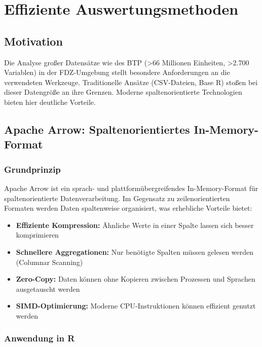 \documentclass[
  ngerman,
  10pt,
  twocolumn]{article}
\providecommand{\tightlist}{%
  \setlength{\itemsep}{0pt}\setlength{\parskip}{0pt}}
\begin{document}
\section{Effiziente Auswertungsmethoden}\label{sec-methoden}

\subsection{Motivation}\label{motivation}

Die Analyse großer Datensätze wie des BTP (\textgreater66 Millionen
Einheiten, \textgreater2.700 Variablen) in der FDZ-Umgebung stellt
besondere Anforderungen an die verwendeten Werkzeuge. Traditionelle
Ansätze (CSV-Dateien, Base R) stoßen bei dieser Datengröße an ihre
Grenzen. Moderne spaltenorientierte Technologien bieten hier deutliche
Vorteile.

\subsection{Apache Arrow: Spaltenorientiertes
In-Memory-Format}\label{apache-arrow-spaltenorientiertes-in-memory-format}

\subsubsection{Grundprinzip}\label{grundprinzip}

Apache Arrow ist ein sprach- und plattformübergreifendes
In-Memory-Format für spaltenorientierte Datenverarbeitung. Im Gegensatz
zu zeilenorientierten Formaten werden Daten spaltenweise organisiert,
was erhebliche Vorteile bietet:

\begin{itemize}
\tightlist
\item
  \textbf{Effiziente Kompression:} Ähnliche Werte in einer Spalte lassen
  sich besser komprimieren
\item
  \textbf{Schnellere Aggregationen:} Nur benötigte Spalten müssen
  gelesen werden (Columnar Scanning)
\item
  \textbf{Zero-Copy:} Daten können ohne Kopieren zwischen Prozessen und
  Sprachen ausgetauscht werden
\item
  \textbf{SIMD-Optimierung:} Moderne CPU-Instruktionen können effizient
  genutzt werden
\end{itemize}

\subsubsection{Anwendung in R}\label{anwendung-in-r}
\end{document}

